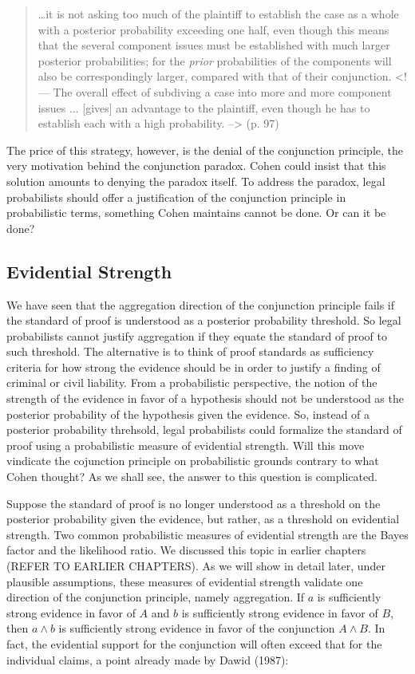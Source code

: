 \documentclass[10pt,dvipsnames,enabledeprecatedfontcommands]{scrartcl}
\begin{document}
\begin{quote}
\dots it is not asking too much of the plaintiff to establish the case as a whole with a posterior probability exceeding one half, even though this means  that the several component issues must be established with much larger posterior probabilities; for the \textit{prior}  probabilities of the components will also be correspondingly larger, compared with that of their conjunction. <!--- The overall effect of subdiving a case into more and more component issues ... [gives] an advantage to the plaintiff, even though he has to establish each with a high probability. --> (p. 97)
 \end{quote}

\noindent  The price of this strategy, however, is the denial of the
conjunction principle, the very motivation behind the conjunction
paradox. Cohen could insist that this solution amounts to denying the
paradox itself. To address the paradox, legal probabilists should offer
a justification of the conjunction principle in probabilistic terms,
something Cohen maintains cannot be done. Or can it be done?

\hypertarget{evidential-strength}{%
\subsection{Evidential Strength}\label{evidential-strength}}

We have seen that the aggregation direction of the conjunction principle
fails if the standard of proof is understood as a posterior probability
threshold. So legal probabilists cannot justify aggregation if they
equate the standard of proof to such threshold. The alternative is to
think of proof standards as sufficiency criteria for how strong the
evidence should be in order to justify a finding of criminal or civil
liability. From a probabilistic perspective, the notion of the strength
of the evidence in favor of a hypothesis should not be understood as the
posterior probability of the hypothesis given the evidence. So, instead
of a posterior probability threhsold, legal probabilists could formalize
the standard of proof using a probabilistic measure of evidential
strength. Will this move vindicate the cojunction principle on
probabilistic grounds contrary to what Cohen thought? As we shall see,
the answer to this question is complicated.

Suppose the standard of proof is no longer understood as a threshold on
the posterior probability given the evidence, but rather, as a threshold
on evidential strength. Two common probabilistic measures of evidential
strength are the Bayes factor and the likelihood ratio. We discussed
this topic in earlier chapters (REFER TO EARLIER CHAPTERS). As we will
show in detail later, under plausible assumptions, these measures of
evidential strength validate one direction of the conjunction principle,
namely aggregation. If \(a\) is sufficiently strong evidence in favor of
\(A\) and \(b\) is sufficiently strong evidence in favor of \(B\), then
\(a\wedge b\) is sufficiently strong evidence in favor of the
conjunction \(A \wedge B\). In fact, the evidential support for the
conjunction will often exceed that for the individual claims, a point
already made by Dawid (1987):
\end{document}
